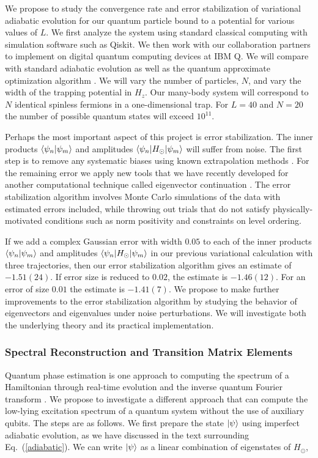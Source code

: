 \documentclass[11pt]{article}
\begin{document}
We propose to study the convergence rate and error stabilization of
variational adiabatic evolution for our quantum particle bound to a
potential for various values of $L$.  We first analyze the system
using standard classical computing with simulation software such as
Qiskit.  We then work with our collaboration partners to implement on
digital quantum computing devices at IBM Q.  We will
compare with standard adiabatic evolution as well as the quantum
approximate optimization algorithm \cite{Farhi:2014}. We will vary the
number of particles, $N$, and vary the width of the trapping potential
in $H_z$.  Our many-body system will correspond to $N$ identical
spinless fermions in a one-dimensional trap.  For $L = 40$ and $N =
20$ the number of possible quantum states will exceed $10^{11}$.

Perhaps the most important aspect of this project is error
stabilization.  The inner products $\braket{\psi_n|\psi_m}$ and
amplitudes $\braket{\psi_n|H_\odot|\psi_m}$ will suffer from noise.
The first step is to remove any systematic biases using known
extrapolation methods \cite{Kandala:2019}. For the remaining error we
apply new tools that we have recently developed for another
computational technique called eigenvector continuation
\cite{Frame:2017fah}.  The error stabilization algorithm involves
Monte Carlo simulations of the data with estimated errors included,
while throwing out trials that do not satisfy physically-motivated
conditions such as norm positivity and constraints on level ordering.
    
If we add a complex Gaussian error with width $0.05$ to each of the
inner products $\braket{\psi_n|\psi_m}$ and amplitudes
$\braket{\psi_n|H_\odot|\psi_m}$ in our previous variational
calculation with three trajectories, then our error stabilization
algorithm gives an estimate of $-1.51(24)$. If error size is reduced
to $0.02$, the estimate is $-1.46(12)$. For an error of size $0.01$
the estimate is $-1.41(7)$.  We propose to make further improvements
to the error stabilization algorithm by studying the behavior of
eigenvectors and eigenvalues under noise perturbations.  We will
investigate both the underlying theory and its practical
implementation.

\subsubsection{Spectral Reconstruction and Transition Matrix Elements}\label{sec_SRTME}
     
Quantum phase estimation is one approach to computing the spectrum of
a Hamiltonian through real-time evolution and the inverse quantum
Fourier transform \cite{Abrams:1999}.  We propose to investigate a
different approach that can compute the low-lying excitation spectrum
of a quantum system without the use of auxiliary qubits.  The steps
are as follows.  We first prepare the state $\ket{\psi}$ using
imperfect adiabatic evolution, as we have discussed in the text
surrounding Eq.~(\ref{adiabatic}). We can write $\ket{\psi}$ as a
linear combination of eigenstates of $H_\odot$,
\end{document}

